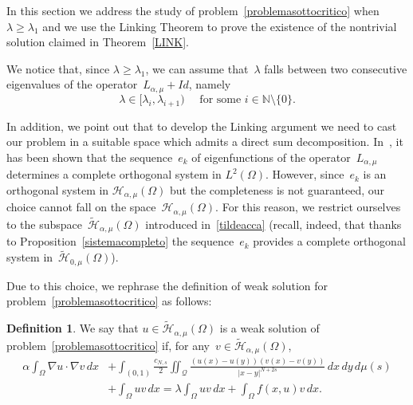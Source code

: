 \documentclass[12pt,a4paper,intlimits,sumlimits]{amsart}
\def \N {\mathbb{N}}
\def \Q {\mathcal Q}
\theoremstyle{definition}
\newtheorem{definition}{Definition}[section]
\theoremstyle{plain}
\numberwithin{equation}{section}
\renewcommand{\ge}{\geqslant}
\begin{document}
In this section we address the study of problem~\eqref{problemasottocritico} when $\lambda\ge\lambda_1$ and we use the Linking Theorem to prove the existence of the nontrivial solution claimed in Theorem~\ref{LINK}.

We notice that, since $\lambda\ge \lambda_1$, we can assume that~$\lambda$ falls between two consecutive eigenvalues of the operator~$L_{\alpha,\mu}+Id$, namely
\begin{equation}\label{successivi}
\lambda\in [\lambda_i, \lambda_{i+1})\quad\mbox{ for some } i\in\N\setminus\{0\}.
\end{equation}

In addition, we point out that to develop the Linking argument we need to cast our problem in a suitable space which admits a direct sum decomposition. In~\cite[Theorem~1.5]{TUTTI}, it has been shown that the sequence~$e_k$ of eigenfunctions of the operator~$L_{\alpha,\mu}$
determines a complete orthogonal system in $L^2(\Omega)$. However, since~$e_k$ is an orthogonal system in $\mathcal{H}_{\alpha, \mu}(\Omega)$ but the completeness is not guaranteed,  our choice cannot fall on the space~$\mathcal{H}_{\alpha, \mu}(\Omega)$. For this reason, we restrict ourselves to the subspace~$\widetilde{\mathcal{H}}_{\alpha, \mu}(\Omega)$ introduced in~\eqref{tildeacca} (recall, indeed, that
thanks to Proposition~\ref{sistemacompleto}
the sequence~$e_k$ provides a complete orthogonal system in~$\widetilde{\mathcal H}_{0, \mu}(\Omega)$).

Due to this choice, we rephrase the definition of weak solution for problem~\eqref{problemasottocritico} as follows:

\begin{definition}\label{wdlinking}
We say that $u\in \widetilde{\mathcal{H}}_{\alpha, \mu}(\Omega)$ is a weak solution of problem~\eqref{problemasottocritico}
if, for any~$v\in\widetilde{\mathcal{H}}_{\alpha, \mu}(\Omega)$,
\begin{equation}\label{wslinking}
\begin{split}
\alpha \int_\Omega \nabla u\cdot\nabla v\, dx &+\int_{(0, 1)} \frac{c_{N, s}}{2} \iint_{\Q} \frac{(u(x)-u(y))(v(x)-v(y))}{|x-y|^{N+2s}} \,dx\,dy\, d\mu(s)\\
&+\int_\Omega uv\, dx = \lambda\int_\Omega uv\, dx+ \int_\Omega f(x, u) v \, dx.
\end{split}
\end{equation}
\end{definition}
\end{document}
